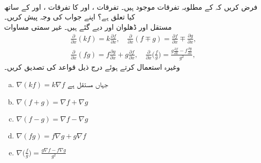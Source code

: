 \\
فرض کریں کہ  کے مطلوبہ تفرقات موجود ہیں۔ تفرقات ،  اور  کا تفرقات ،  اور  کے ساتھ کیا تعلق ہے؟ اپنے جواب کی وجہ پیش کریں۔
\\
مستقل  اور ڈھلوان  اور    دیے گئے ہیں۔  غیر سمتی مساوات
\begin{align*}
\frac{\partial}{\partial x}(kf)=k\frac{\partial f}{\partial x},\quad \frac{\partial}{\partial x}(f\mp g)=\frac{\partial f}{\partial x}\mp \frac{\partial g}{\partial x},\\
\frac{\partial}{\partial x}(fg)=f\frac{\partial g}{\partial x}+g\frac{\partial f}{\partial x},\quad \frac{\partial}{\partial x}\big(\frac{f}{g}\big)=\frac{g\frac{\partial f}{\partial x}-f\frac{\partial g}{\partial x}}{g^2},
\end{align*}
وغیرہ استعمال کرتے ہوئے درج ذیل قواعد کی تصدیق کریں۔
\begin{enumerate}[a.]
\item
$\nabla(kf)=k\nabla f$\quad
جہاں  مستقل ہے
\item
$\nabla (f+g)=\nabla f+\nabla g$
\item
$\nabla (f-g)=\nabla f-\nabla g$
\item
$\nabla (fg)=f\nabla g+g\nabla f$
\item
$\nabla\big(\frac{f}{g}\big)=\frac{g\nabla f-f\nabla g}{g^2}$
\end{enumerate}
